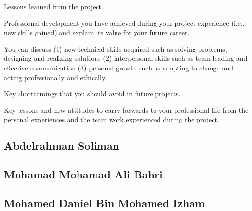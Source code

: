 \documentclass[../main.tex]{subfiles}
\begin{document}
\begin{newrequirements}
    \begin{todolist}
    \item Lessons learned from the project. 

    \item Professional development you have 
        achieved during your project 
        experience (i.e., new skills gained) 
        and explain its value for your future 
        career. 

    \item You can discuss (1) new technical 
        skills acquired such as solving 
        problems, designing and realizing 
        solutions (2) interpersonal skills such 
        as team leading and effective 
        communication (3) personal growth such 
        as adapting to change and acting 
        professionally and ethically. 

    \item Key shortcomings that you should avoid 
        in future projects. 

    \item Key lessons and new attitudes to carry 
        forwards to your professional life from 
        the personal experiences and the team 
        work experienced during the project. 
                
    \end{todolist}
\end{newrequirements}

\subsection{Abdelrahman Soliman}

\lipsum[1]

\subsection{Mohamad Mohamad Ali Bahri}

\lipsum[2]

\subsection{Mohamed Daniel Bin Mohamed Izham}

\lipsum[3]
\end{document}
